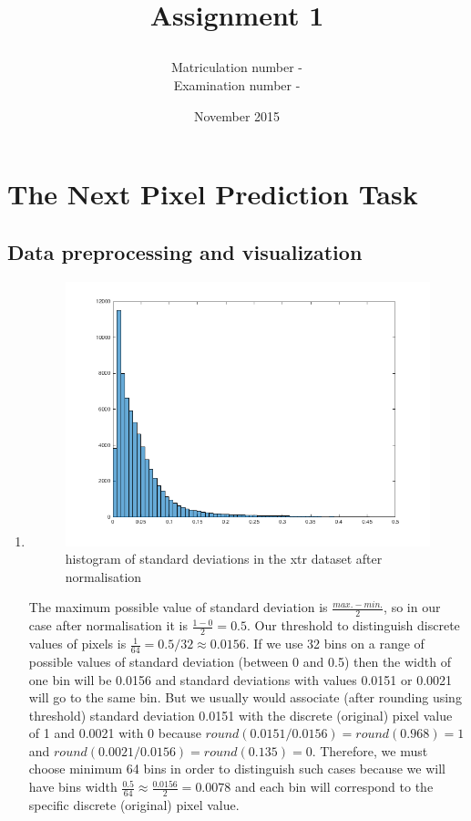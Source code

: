 \documentclass{article}
\title{\subject\\Assignment 1}
\date{November 2015}
\author{Matriculation number - \matricno\\Examination number - \exmno}
\begin{document}
\maketitle
	\section{The Next Pixel Prediction Task}
		\subsection{Data preprocessing and visualization}
			 \begin{enumerate}[label=(\alph*)]
			 	\item
				 	\begin{figure}[htp]
				 		\centering
				 		\includegraphics[width=12cm]{images/p1-1-a_std_hist.png}
				 		\caption{histogram of standard deviations in the xtr dataset after normalisation}
				 		\label{fig:p1-1-a_std_hist}
				 	\end{figure}
				 	The maximum possible value of standard deviation is $\frac{max. - min.}{2}$, so in our case after normalisation it is $\frac{1 - 0}{2}= 0.5$. Our threshold to distinguish discrete values of pixels is $\frac{1}{64} = 0.5 / 32 \approx 0.0156$. If we use 32 bins on a range of possible values of standard deviation (between 0 and 0.5) then the width of one bin will be 0.0156 and standard deviations with values  0.0151 or 0.0021 will go to the same bin. But we usually would associate (after rounding using threshold) standard deviation 0.0151 with the discrete (original) pixel value of 1 and 0.0021 with 0 because $round(0.0151/0.0156)=round(0.968)=1$ and $round(0.0021/0.0156)=round(0.135)=0$. Therefore, we must choose minimum 64 bins in order to distinguish such cases because we will have bins width $\frac{0.5}{64} \approx \frac{0.0156}{2} = 0.0078$ and each bin will correspond to the specific discrete (original) pixel value.\\

\end{enumerate}
\end{document}
